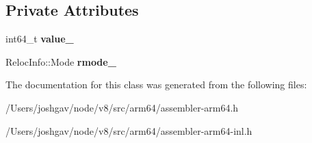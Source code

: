 \subsection*{Private Attributes}
\begin{DoxyCompactItemize}
\item 
int64\+\_\+t {\bfseries value\+\_\+}\hypertarget{classv8_1_1internal_1_1_immediate_aea97e63861bac121d59c43e95a5119f2}{}\label{classv8_1_1internal_1_1_immediate_aea97e63861bac121d59c43e95a5119f2}

\item 
Reloc\+Info\+::\+Mode {\bfseries rmode\+\_\+}\hypertarget{classv8_1_1internal_1_1_immediate_af5de339fd26d5394fd04c00bb04c9118}{}\label{classv8_1_1internal_1_1_immediate_af5de339fd26d5394fd04c00bb04c9118}

\end{DoxyCompactItemize}


The documentation for this class was generated from the following files\+:\begin{DoxyCompactItemize}
\item 
/\+Users/joshgav/node/v8/src/arm64/assembler-\/arm64.\+h\item 
/\+Users/joshgav/node/v8/src/arm64/assembler-\/arm64-\/inl.\+h\end{DoxyCompactItemize}
